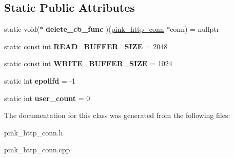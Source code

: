 \subsection*{Static Public Attributes}
\begin{DoxyCompactItemize}
\item 
\mbox{\label{classpink__http__conn_a36a48a19aa593001494eb51106628ebd}} 
static void($\ast$ {\bfseries delete\+\_\+cb\+\_\+func} )(\hyperlink{classpink__http__conn}{pink\+\_\+http\+\_\+conn} $\ast$conn) = nullptr
\item 
\mbox{\label{classpink__http__conn_a240ddaa8b2707d66601b1b82c002ef96}} 
static const int {\bfseries R\+E\+A\+D\+\_\+\+B\+U\+F\+F\+E\+R\+\_\+\+S\+I\+ZE} = 2048
\item 
\mbox{\label{classpink__http__conn_a7764e0564be1e1ae66c44cf34550efea}} 
static const int {\bfseries W\+R\+I\+T\+E\+\_\+\+B\+U\+F\+F\+E\+R\+\_\+\+S\+I\+ZE} = 1024
\item 
\mbox{\label{classpink__http__conn_a106c011c818e2a80dbb14c61abbe9a2a}} 
static int {\bfseries epollfd} = -\/1
\item 
\mbox{\label{classpink__http__conn_a4796952e9f7dc2a940e5681bc8f04139}} 
static int {\bfseries user\+\_\+count} = 0
\end{DoxyCompactItemize}


The documentation for this class was generated from the following files\+:\begin{DoxyCompactItemize}
\item 
pink\+\_\+http\+\_\+conn.\+h\item 
pink\+\_\+http\+\_\+conn.\+cpp\end{DoxyCompactItemize}
